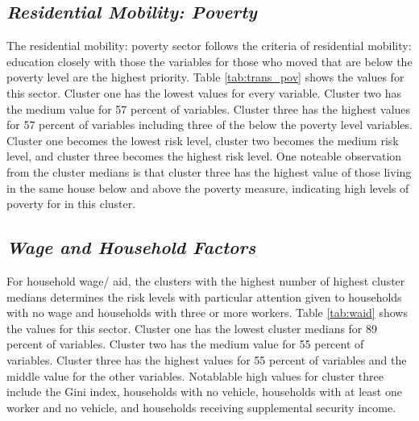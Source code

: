 

\pagebreak

\subsection{\textit{Residential Mobility: Poverty}}

The residential mobility: poverty sector follows the criteria of residential mobility: education closely with those the variables for those who moved that are below the poverty level are the highest priority. Table \ref{tab:trans_pov} shows the values for this sector. Cluster one has the lowest values for every variable. Cluster two has the medium value for 57 percent of variables. Cluster three has the highest values for 57 percent of variables including three of the below the poverty level variables. Cluster one becomes the lowest risk level, cluster two becomes the medium risk level, and cluster three becomes the highest risk level. One noteable observation from the cluster medians is that cluster three has the highest value of those living in the same house below and above the poverty measure, indicating high levels of poverty for \cts in this cluster.



\subsection{\textit{Wage and Household Factors}}

For household wage/ aid, the clusters with the highest number of highest cluster medians determines the risk levels with particular attention given to households with no wage and households with three or more workers. Table \ref{tab:waid} shows the values for this sector. Cluster one has the lowest cluster medians for 89 percent of variables. Cluster two has the medium value for 55 percent of variables. Cluster three has the highest values for 55 percent of variables and the middle value for the other variables. Notablable high values for cluster three include the Gini index, households with no vehicle, households with at least one worker and no vehicle, and households receiving supplemental security income.  



